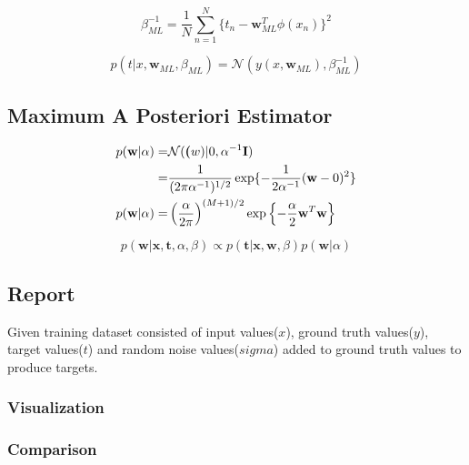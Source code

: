 \documentclass[12pt,twoside,a4paper]{article}
\begin{document}
\begin{equation} \label{BETAML}
    \beta_{ML}^{-1} = \frac{1}{N}\sum_{n=1}^{N}\{t_n - \textbf{w}_{ML}^T\phi(x_n)\}^2
\end{equation}

\begin{equation} \label{PREDDML}
    p(t|x,\textbf{w}_{ML},\beta_{ML}) = \mathcal{N}(y(x,\textbf{w}_{ML}), \beta^{-1}_{ML})
\end{equation}

\subsection{Maximum A Posteriori Estimator}

\begin{align} 
p(\textbf{w}|\alpha) =& \mathcal{N}(\textbf(w)|0,\alpha^{-1}\textbf{I}) \\
=& \frac{1}{(2\pi\alpha^{-1})^{1/2}}\exp\{-\frac{1}{2\alpha^{-1}}(\textbf{w}-0)^2\} \\
p(\textbf{w}|\alpha) =& \left( \frac{\alpha}{2\pi}\right)^{(M+1)/2} \exp\left\{ -\frac{\alpha}{2}\textbf{w}^T\textbf{w}\right\}
\end{align}

\begin{equation}
    p(\textbf{w}|\textbf{x},\textbf{t},\alpha,\beta) \propto p(\textbf{t}|\textbf{x},\textbf{w},\beta) p(\textbf{w}|\alpha)
\end{equation}

\subsection{Report}
Given training dataset consisted of input values($x$), ground truth values($y$), target values($t$) and random noise values($sigma$) added to ground truth values to produce targets.
\subsubsection{Visualization}

\subsubsection{Comparison}
\end{document}
